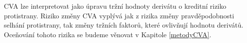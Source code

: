 \documentclass[a4paper,12pt]{report}
\theoremstyle{definition} \newtheorem{definice}[veta]{Definice}
\theoremstyle{remark}
\begin{document}
CVA lze interpretovat jako úpravu tržní hodnoty derivátu o kreditní riziko protistrany.
Riziko změny CVA vyplývá jak z rizika změny pravděpodobnosti selhání protistrany, tak změny tržních faktorů, které ovlivňují hodnotu derivátů.
Oceňování tohoto rizika se budeme věnovat v Kapitole \ref{metodyCVA}.




\end{document}
